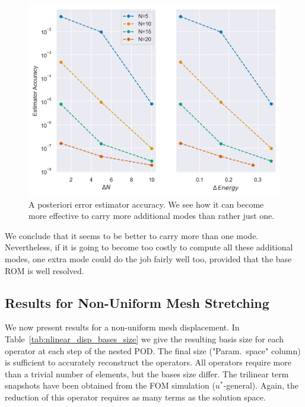 \documentclass[../../thesis.tex]{subfiles}
\begin{document}
\begin{figure}[h]
    \centering
    \includegraphics[width=1\columnwidth]{research_project/piston/figures/rb_certification/estimator_accuracy.png}
    \caption{A posteriori error estimator accuracy.
    We see how it can become more effective to carry more additional modes than rather just one.}
    \label{fig:estimator_accuracy}
\end{figure}
We conclude that it seems to be better to carry more than one mode.
Nevertheless, if it is going to become too costly to compute all these additional modes,
one extra mode could do the job fairly well too, provided that the base ROM is well resolved.



\clearpage
\subsection{Results for Non-Uniform Mesh Stretching}
\label{sec:arbitrary_mesh_results}
We now present results for a non-uniform mesh displacement. 
In Table~\ref{tab:nlinear_disp_bases_size} we give the resulting basis size 
for each operator at each step of the nested POD.
The final size (\mbox{"Param. space"} column) is sufficient to accurately reconstruct the operators.
All operators require more than a trivial number of elements, 
but the bases size differ.
The trilinear term snapshots have been obtained from the FOM simulation 
($u^{*}$-general).
Again, the reduction of this operator requires as many terms as the solution space.
\end{document}
